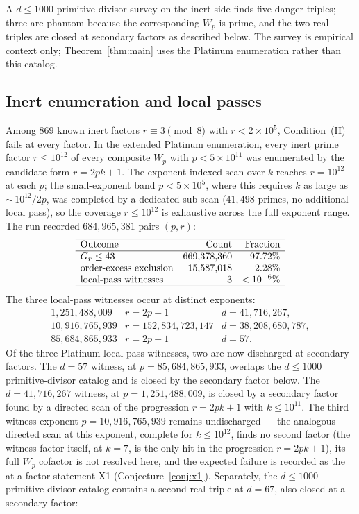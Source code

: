 \documentclass[11pt]{amsart}
\theoremstyle{plain}
\theoremstyle{definition}
\theoremstyle{remark}
\numberwithin{equation}{section}
\begin{document}
A $d\leq1000$ primitive-divisor survey on the inert side finds five danger triples; three are phantom because the corresponding $W_p$ is prime, and the two real triples are closed at secondary factors as described below. The survey is empirical context only; Theorem~\ref{thm:main} uses the Platinum enumeration rather than this catalog.

\subsection{Inert enumeration and local passes}\label{sec:inert-survey}\label{sec:secondary}

Among 869 known inert factors $r\equiv3\pmod8$ with $r<2\times10^5$, Condition~(II) fails at every factor. In the extended Platinum enumeration, every inert prime factor $r\leq10^{12}$ of every composite $W_p$ with $p<5\times10^{11}$ was enumerated by the candidate form $r=2pk+1$. The exponent-indexed scan over $k$ reaches $r=10^{12}$ at each $p$; the small-exponent band $p<5\times10^5$, where this requires $k$ as large as ${\sim}\,10^{12}/2p$, was completed by a dedicated sub-scan ($41{,}498$ primes, no additional local pass), so the coverage $r\leq10^{12}$ is exhaustive across the full exponent range. The run recorded $684{,}965{,}381$ pairs $(p,r)$:
\[
\begin{array}{lrr}
\hline
\text{Outcome} & \text{Count} & \text{Fraction}\\
\hline
G_r\leq43 & 669{,}378{,}360 & 97.72\%\\
\text{order-excess exclusion} & 15{,}587{,}018 & 2.28\%\\
\text{local-pass witnesses} & 3 & <10^{-6}\%\\
\hline
\end{array}
\]
The three local-pass witnesses occur at distinct exponents:
\[
\begin{array}{rll}
1{,}251{,}488{,}009 & r=2p+1 & d=41{,}716{,}267,\\
10{,}916{,}765{,}939 & r=152{,}834{,}723{,}147 & d=38{,}208{,}680{,}787,\\
85{,}684{,}865{,}933 & r=2p+1 & d=57.
\end{array}
\]
Of the three Platinum local-pass witnesses, two are now discharged at secondary factors. The $d=57$ witness, at $p=85{,}684{,}865{,}933$, overlaps the $d\leq1000$ primitive-divisor catalog and is closed by the secondary factor below. The $d=41{,}716{,}267$ witness, at $p=1{,}251{,}488{,}009$, is closed by a secondary factor found by a directed scan of the progression $r=2pk+1$ with $k\leq10^{11}$. The third witness exponent $p=10{,}916{,}765{,}939$ remains undischarged --- the analogous directed scan at this exponent, complete for $k\leq10^{12}$, finds no second factor (the witness factor itself, at $k=7$, is the only hit in the progression $r=2pk+1$), its full $W_p$ cofactor is not resolved here, and the expected failure is recorded as the at-a-factor statement X1 (Conjecture~\ref{conj:x1}). Separately, the $d\leq1000$ primitive-divisor catalog contains a second real triple at $d=67$, also closed at a secondary factor:
\end{document}
